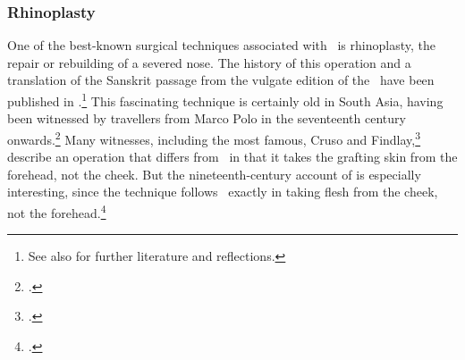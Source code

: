 

\subsubsection{Rhinoplasty}
\label{sec:rhinoplasty}

One of the best-known surgical techniques associated with \SS\ is rhinoplasty, the repair or rebuilding of a severed nose. The history of this operation and a translation of the Sanskrit passage from
the vulgate edition of the \SS\ have been published in \citet[67--70, 99--100]{wuja-2003}.\footnote{See
also \cite[IB, 327--328, note 186]{meul-hist} for further literature and
reflections.}  This fascinating technique is certainly old in South Asia, having
been witnessed by travellers from Marco Polo in the seventeenth century
onwards.\footcite[ii.301]{manu-stor} Many witnesses, including the most famous,
Cruso and Findlay,\footcite[883, 891\,f.]{cowasjee} describe an operation that
differs from \SS\ in that it takes the grafting skin from the
forehead, not the cheek.  But the nineteenth-century account of
\citeauthor{thor-bann} is especially interesting, since the technique follows
\SS\ exactly in taking flesh from the cheek, not the
forehead.\footcite[352--3]{thor-bann}

